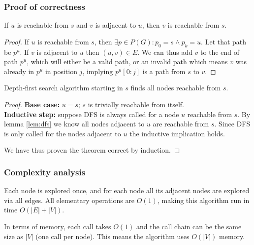 \subsubsection{Proof of correctness}
\begin{lemma} \label{lem:dfs}
    If $u$ is reachable from $s$ and $v$ is adjacent to $u$, then $v$ is reachable from $s$.
\end{lemma}
\begin{proof}
    If $u$ is reachable from $s$, then $\exists p \in P(G) \colon p_0 = s \wedge p_k = u$. Let that path be $p^u$. If $v$ is adjacent to $u$ then $(u,v) \in E$. We can thus add $v$ to the end of path $p^u$, which will either be a valid path, or an invalid path which means $v$ was already in $p^u$ in position $j$, implying $p^u[0:j]$ is a path from $s$ to $v$.
\end{proof}
\begin{theorem}
    Depth-first search algorithm starting in $s$ finds all nodes reachable from $s$.
\end{theorem}
\begin{proof} \textbf{Base case:} $u=s$; $s$ is trivially reachable from itself. \\
\textbf{Inductive step:} suppose \textsc{DFS} is always called for a node $u$ reachable from $s$. By lemma \ref{lem:dfs} we know all nodes adjacent to $u$ are reachable from $s$. Since \textsc{DFS} is only called for the nodes adjacent to $u$ the inductive implication holds.\par
We have thus proven the theorem correct by induction.
\end{proof}
\subsubsection{Complexity analysis}
Each node is explored once, and for each node all its adjacent nodes are explored via all edges. All elementary operations are $O(1)$, making this algorithm run in time $O(|E|+|V|)$.\par
In terms of memory, each call takes $O(1)$ and the call chain can be the same size as $|V|$ (one call per node). This means the algorithm uses $O(|V|)$ memory.
